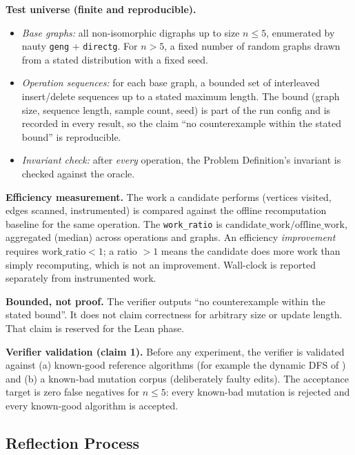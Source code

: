 \documentclass[12pt,a4paper]{article}
\begin{document}
\textbf{Test universe (finite and reproducible).}
\begin{itemize}[noitemsep]
  \item \emph{Base graphs:} all non-isomorphic digraphs up to size $n \le 5$, enumerated by nauty \texttt{geng} + \texttt{directg}. For $n > 5$, a fixed number of random graphs drawn from a stated distribution with a fixed seed.
  \item \emph{Operation sequences:} for each base graph, a bounded set of interleaved insert/delete sequences up to a stated maximum length. The bound (graph size, sequence length, sample count, seed) is part of the run config and is recorded in every result, so the claim ``no counterexample within the stated bound'' is reproducible.
  \item \emph{Invariant check:} after \emph{every} operation, the Problem Definition's invariant is checked against the oracle.
\end{itemize}

\textbf{Efficiency measurement.} The work a candidate performs (vertices visited, edges scanned, instrumented) is compared against the offline recomputation baseline for the same operation. The \texttt{work\_ratio} is $\text{candidate\_work} / \text{offline\_work}$, aggregated (median) across operations and graphs. An efficiency \emph{improvement} requires $\text{work\_ratio} < 1$; a ratio $> 1$ means the candidate does more work than simply recomputing, which is not an improvement. Wall-clock is reported separately from instrumented work.

\textbf{Bounded, not proof.} The verifier outputs ``no counterexample within the stated bound''. It does not claim correctness for arbitrary size or update length. That claim is reserved for the Lean phase.

\textbf{Verifier validation (claim 1).} Before any experiment, the verifier is validated against (a) known-good reference algorithms (for example the dynamic DFS of \cite{yang2019dynamic}) and (b) a known-bad mutation corpus (deliberately faulty edits). The acceptance target is zero false negatives for $n \le 5$: every known-bad mutation is rejected and every known-good algorithm is accepted.

\subsection{Reflection Process}
\label{sec:reflection}
\end{document}
